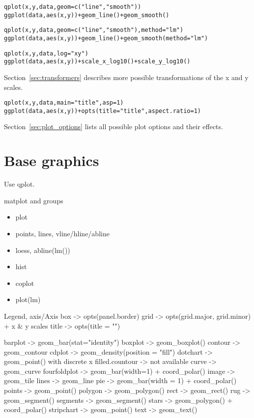 \begin{alltt}
qplot(x, y, data, geom=c("line", "smooth"))
ggplot(data, aes(x, y)) + geom_line() + geom_smooth()
\end{alltt}

\begin{alltt}
qplot(x, y, data, geom=c("line", "smooth"), method="lm")
ggplot(data, aes(x, y)) + geom_line() + geom_smooth(method="lm")
\end{alltt}


\begin{alltt}
qplot(x, y, data, log="xy")
ggplot(data, aes(x, y)) + scale_x_log10() + scale_y_log10()
\end{alltt}

Section~\ref{sec:transformers} describes more possible transformations of the x and y scales.

\begin{alltt}
qplot(x, y, data, main="title", asp = 1)
ggplot(data, aes(x, y)) + opts(title = "title", aspect.ratio = 1)
\end{alltt}

Section~\ref{sec:plot_options} lists all possible plot options and their effects.


\section{Base graphics}
\label{sec:base_graphics}

Use qplot.

matplot and groups

\begin{itemize}
  \item plot
  \item points, lines, vline/hline/abline
  \item loess, abline(lm())
  \item hist
  \item coplot
  \item plot(lm)
\end{itemize}

Legend, axis/Axis
box -> opts(panel.border)
grid -> opts(grid.major, grid.minor) + x & y scales
title -> opts(title = "")

barplot -> geom_bar(stat="identity")
boxplot -> geom_boxplot()
contour -> geom_contour
cdplot -> geom_density(position = "fill")
dotchart -> geom_point() with discrete x
filled.countour -> not available
curve -> geom_curve
fourfoldplot -> geom_bar(width=1) + coord_polar()
image -> geom_tile
lines -> geom_line
pie -> geom_bar(width = 1) + coord_polar()
points -> geom_point()
polygon -> geom_polygon()
rect -> geom_rect()
rug -> geom_segment()
segments -> geom_segment()
stars -> geom_polygon() + coord_polar()
stripchart -> geom_point()
text -> geom_text()

